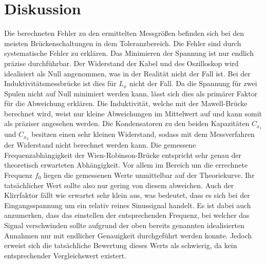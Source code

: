 \section{Diskussion}
\label{sec:Diskussion}
Die berechneten Fehler zu den ermittelten Messgrößen befinden sich bei den meisten
Brückenschaltungen in dem Toleranzbereich. Die Fehler sind durch systematische Fehler zu erklären.
Das Minimieren der Spannung ist nur endlich präzise durchführbar. Der Widerstand der Kabel und des Oszilloskop wird
idealisiert als Null angenommen, was in der Realität nicht der Fall ist.
Bei der Induktivitätsmessbrücke ist dies
für $L_x$ nicht der Fall. Da die Spannung für zwei Spulen nicht auf Null minimiert werden kann, lässt sich dies
als primärer Faktor für die Abweichung erklären. Die Induktivität, welche mit der Mawell-Brücke berechnet wird, weist
nur kleine Abweichungen im Mittelwert auf und kann somit als präziser angesehen werden. Die Kondensatoren
zu den beiden Kapazitäten $C_{x_1}$ und $C_{x_2}$ besitzen einen sehr kleinen Widerstand, sodass mit dem
Messverfahren der Widerstand nicht berechnet werden kann.
Die gemessene Frequenzabhängigkeit der Wien-Robinson-Brücke entspricht sehr genau der theoretisch erwarteten Abhängigkeit. Vor allem
im Bereich um die errechnete Frequenz $f_0$ liegen die gemessenen Werte unmittelbar auf der Theoriekurve. Ihr tatsächlicher Wert sollte
also nur gering von diesem abweichen.
Auch der Klirrfaktor fällt wie erwartet sehr klein aus, was bedeutet, dass es sich bei der Eingangsspannung um ein relativ reines
Sinussignal handelt. Es ist dabei auch anzumerken, dass das einstellen der entsprechenden Frequenz, bei welcher das Signal
verschwinden sollte aufgrund der oben bereits genannten idealisierten Annahmen nur mit endlicher Genauigkeit durchgeführt werden konnte.
Jedoch erweist sich die tatsächliche Bewertung dieses Werts als schwierig, da kein entsprechender Vergleichswert existert.
